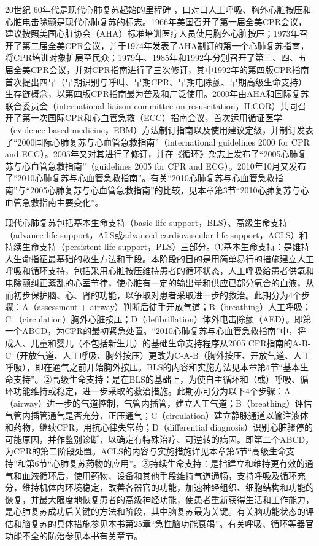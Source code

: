 20世纪 60年代是现代心肺复苏起始的里程碑
，口对口人工呼吸、胸外心脏按压和心脏电击除颤是现代心肺复苏的标志。1966年美国召开了第一届全美CPR会议，建议按照美国心脏协会（AHA）标准培训医疗人员使用胸外心脏按压；1973年召开了第二届全美CPR会议，并于1974年发表了AHA制订的第一个心肺复苏指南，将CPR培训对象扩展至民众；1979年、1985年和1992年分别召开了第三、四、五届全美CPR会议，并对CPR指南进行了三次修订，其中1992年的第四版CPR指南首次提出四早（早期识别与呼叫、早期CPR、早期电除颤、早期高级生命支持）生存链概念，以第四版CPR指南最为普及和广泛使用。2000年由AHA和国际复苏联合委员会（international
liaison committee on
resuscitation，ILCOR）共同召开了第一次国际CPR和心血管急救（ECC）指南会议，首次运用循证医学（evidence
based
medicine，EBM）方法制订指南以及使用建议定级，并制订发表了“2000国际心肺复苏与心血管急救指南”（international
guidelines 2000 for CPR and
ECG）。2005年又对其进行了修订，并在《循环》杂志上发布了“2005心肺复苏与心血管急救指南”（guidelines
2005 for CPR and
ECG）。2010年10月又发布了“2010心肺复苏与心血管急救指南”。有关“2010心肺复苏与心血管急救指南”与“2005心肺复苏与心血管急救指南”的比较，见本章第3节“2010心肺复苏与心血管急救指南主要变化”。

现代心肺复苏包括基本生命支持（basic life
support，BLS）、高级生命支持（advance life support，ALS或advanced
cardiovascular life support，ACLS）和持续生命支持（persistent life
support，PLS）三部分。①基本生命支持：是维持人生命指征最基础的救生方法和手段。本阶段的目的是用简单易行的措施建立人工呼吸和循环支持，包括采用心脏按压维持患者的循环状态，人工呼吸给患者供氧和电除颤纠正紊乱的心室节律，使心脏有一定的输出量和供应已部分氧合的血液，从而初步保护脑、心、肾的功能，以争取对患者采取进一步的救治。此期分为4个步骤：A（assessment
+ airway）判断后徒手开放气道；B（breathing）人工呼吸；C
（circulation）胸外心脏按压；D（defibrillation）体外电击除颤（AED）。即第一个ABCD，为CPR的最初紧急处置。“2010心肺复苏与心血管急救指南”中，将成人、儿童和婴儿（不包括新生儿）的基础生命支持程序从2005
CPR指南的A-B-C（开放气道、人工呼吸、胸外按压）更改为C-A-B（胸外按压、开放气道、人工呼吸），即在通气之前开始胸外按压。BLS的内容和实施方法见本章第4节“基本生命支持”。②高级生命支持：是在BLS的基础上，为使自主循环和（或）呼吸、循环功能维持或稳定，进一步采取的救治措施。此期亦可分为以下4个步骤：A（airway）进一步的气道控制，气管内插管，建立人工气道；B（breathing）评估气管内插管通气是否充分，正压通气；C（circulation）建立静脉通道以输注液体和药物，继续CPR，用抗心律失常药；D（differential
diagnosis）识别心脏骤停的可能原因，并作鉴别诊断，以确定有特殊治疗、可逆转的病因。即第二个ABCD，为CPR的第二阶段处置。ACLS的内容与实施措施详见本章第5节“高级生命支持”和第6节“心肺复苏药物的应用”。③持续生命支持：是指建立和维持更有效的通气和血液循环后，使用药物、设备和其他手段维持气道通畅，支持呼吸及循环充分，维持机体内环境稳定，改善各器官的功能，加速神经组织、细胞结构和功能的恢复，并最大限度地恢复患者的高级神经功能，使患者重新获得生活和工作能力，是心肺复苏成功后关键的方法和阶段，其中脑复苏最为关键。有关脑功能状态的评估和脑复苏的具体措施参见本书第25章“急性脑功能衰竭”。有关呼吸、循环等器官功能不全的防治参见本书有关章节。

